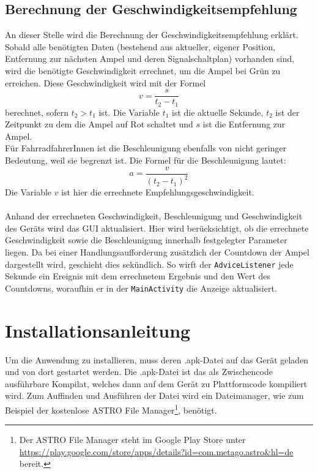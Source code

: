\subsection{Berechnung der Geschwindigkeitsempfehlung}
An dieser Stelle wird die Berechnung der Geschwindigkeitsempfehlung erklärt. Sobald alle benötigten Daten (bestehend aus aktueller, eigener Position, Entfernung zur nächsten Ampel und deren Signalschaltplan) vorhanden sind, wird die benötigte Geschwindigkeit errechnet, um die Ampel bei Grün zu erreichen. Diese Geschwindigkeit wird mit der Formel 
\[ v = \frac{s}{t_{2} - t_{1}} \]
berechnet, sofern $t_2 > t_1$ ist. Die Variable $t_1$ ist die aktuelle Sekunde, $t_2$ ist der Zeitpunkt zu dem die Ampel auf Rot schaltet und $s$ ist die Entfernung zur Ampel. \\
Für FahrradfahrerInnen ist die Beschleunigung ebenfalls von nicht geringer Bedeutung, weil sie begrenzt ist. Die Formel für die Beschleunigung lautet:
\[ a = \frac{v}{(t_{2} - t_{1})^{2}} \] 
Die Variable $v$ ist hier die errechnete Empfehlungsgeschwindigkeit.\\\\
Anhand der errechneten Geschwindigkeit, Beschleunigung und Geschwindigkeit des Geräts wird das \gls{GUI} aktualisiert. Hier wird berücksichtigt, ob die errechnete Geschwindigkeit sowie die Beschleunigung innerhalb festgelegter Parameter liegen. Da bei einer Handlungsaufforderung zusätzlich der Countdown der Ampel dargestellt wird, geschieht dies sekündlich. So wirft der \texttt{AdviceListener} jede Sekunde ein Ereignis mit dem errechnetem Ergebnis und den Wert des Countdowns, woraufhin er in der \texttt{MainActivity} die Anzeige aktualisiert.
%
%
\section{Installationsanleitung}
Um die Anwendung zu installieren, muss deren .apk-Datei auf das Gerät geladen und von dort gestartet werden. Die .apk-Datei ist das als Zwischencode ausführbare Kompilat, welches dann auf dem Gerät zu Plattformcode kompiliert wird. Zum Auffinden und Ausführen der Datei wird ein Dateimanager, wie zum Beispiel der kostenlose ASTRO File Manager\footnote{ Der ASTRO File Manager steht im Google Play Store unter \url{https://play.google.com/store/apps/details?id=com.metago.astro&hl=de} bereit.},  benötigt. 
